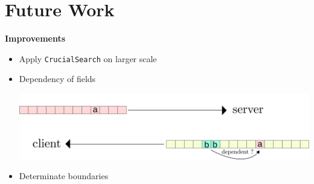 \documentclass{beamer}
\newcounter{m} %
\newcounter{c} %
\begin{document}
\section{Future Work}


\begin{frame}{\bf Improvements}

\begin{itemize}
    \item Apply \texttt{CrucialSearch} on larger scale
    \item Dependency of fields\\
    \begin{center}\includegraphics[scale=0.5]{relations.png}\end{center}
    \item Determinate boundaries
\end{itemize}
\end{frame}
\end{document}
